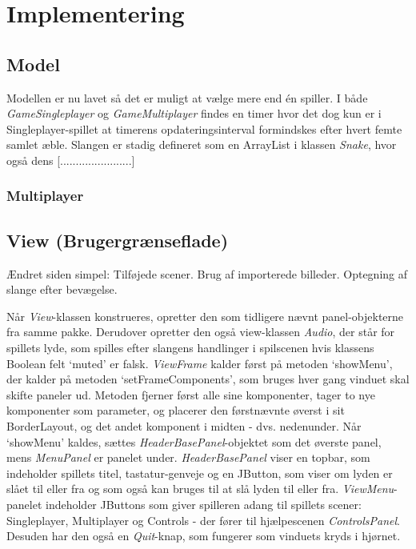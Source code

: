 
\section{Implementering}
\subsection{Model}
Modellen er nu lavet så det er muligt at vælge mere end én spiller. I både \textit{GameSingleplayer} og \textit{GameMultiplayer} findes en timer hvor det dog kun er i Singleplayer-spillet at timerens opdateringsinterval formindskes efter hvert femte samlet æble. Slangen er stadig defineret som en ArrayList i klassen \textit{Snake}, hvor også dens [.......................]

\subsubsection{Multiplayer}

\subsection{View (Brugergrænseflade)}
Ændret siden simpel: Tilføjede scener. Brug af importerede billeder. Optegning af slange efter bevægelse.

Når \textit{View}-klassen konstrueres, opretter den som tidligere nævnt panel-objekterne fra samme pakke. Derudover opretter den også view-klassen \textit{Audio}, der står for spillets lyde, som spilles efter slangens handlinger i spilscenen hvis klassens Boolean felt `muted' er falsk. \textit{ViewFrame} kalder først på metoden `showMenu', der kalder på metoden `setFrameComponents', som bruges hver gang vinduet skal skifte paneler ud. Metoden fjerner først alle sine komponenter, tager to nye komponenter som parameter, og placerer den førstnævnte øverst i sit BorderLayout, og det andet komponent i midten - dvs. nedenunder. Når `showMenu' kaldes, sættes \textit{HeaderBasePanel}-objektet som det øverste panel, mens \textit{MenuPanel} er panelet under. \textit{HeaderBasePanel} viser en topbar, som indeholder spillets titel, tastatur-genveje og en JButton, som viser om lyden er slået til eller fra og som også kan bruges til at slå lyden til eller fra. \textit{ViewMenu}-panelet indeholder JButtons som giver spilleren adang til spillets scener: Singleplayer, Multiplayer og Controls - der fører til hjælpescenen \textit{ControlsPanel}. Desuden har den også en \textit{Quit}-knap, som fungerer som vinduets kryds i hjørnet. 


